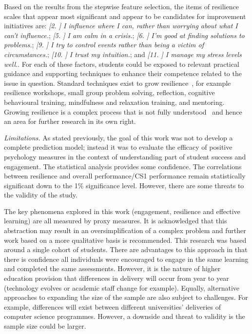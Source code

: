 \documentclass[sigconf]{acmart}
\begin{document}
Based on the results from the stepwise feature selection, the items of resilience scales that appear most significant and appear to be candidates for improvement initiatives are: {\emph{[2. ] I influence where I can, rather than worrying about what I can't influence.}}; {\emph{[5. ] I am calm in a crisis.}}; {\emph{[6. ] I'm good at finding solutions to problems.}}; {\emph{[9. ] I try to control events rather than being a victim of circumstances.}}; {\emph{[10. ] I trust my intuition.}}; and {\emph{[11. ] I manage my stress levels well.}}. For each of these factors, students could be exposed to relevant practical guidance and supporting techniques to enhance their competence related to the issue in question. Standard techniques exist to grow resilience~\cite{Walker2006, Vailes2017, Rodgers2016}, for example resilience workshops, small group problem solving, reflection, cognitive behavioural training, mindfulness and relaxation training, and mentoring. Growing resilience is a complex process that is not fully understood~\cite{Rodgers2016} and hence an area for further research in its own right.

{\em Limitations.}
As stated previously, the goal of this work was not to develop a complete prediction model; instead it was to evaluate the efficacy of positive psychology measures in the context of understanding part of student success and engagement. The statistical analysis provides some confidence. The correlations between resilience and overall performance/CS1 performance remain statistically significant down to the 1\% significance level. However, there are some threats to the validity of the study. 

The key phenomena explored in this work (engagement, resilience and effective learning) are all measured by proxy measures. It is acknowledged that this abstraction may result in an oversimplification of a complex problem and further work based on a more qualitative basis is recommended. This research was based around a single cohort of students. There are advantages to this approach in that there is confidence all individuals were encouraged to engage in the same learning and completed the same assessments. However, it is the nature of higher education provision that differences in delivery will occur from year to year (technology evolves or academic staff change for example). Equally, alternative approaches to expanding the size of the sample are also subject to challenges. For example, differences will exist between different universities' deliveries of computer science programmes. However, a downside and threat to validity is the sample size could be larger. 
\end{document}
